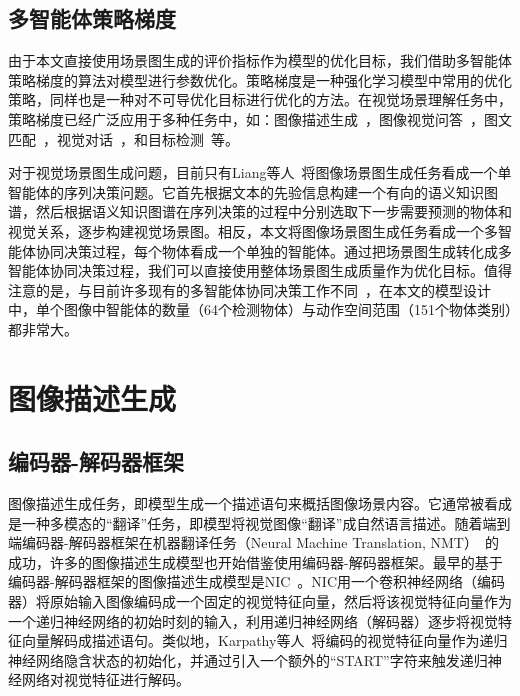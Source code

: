 \subsection{多智能体策略梯度}

由于本文直接使用场景图生成的评价指标作为模型的优化目标，我们借助多智能体策略梯度的算法对模型进行参数优化。策略梯度是一种强化学习模型中常用的优化策略，同样也是一种对不可导优化目标进行优化的方法。在视觉场景理解任务中，策略梯度已经广泛应用于多种任务中，如：图像描述生成~\cite{ranzato2016sequence,ren2017deep,liu2017improved,rennie2017self,zhang2017actor,liu2018context}，图像视觉问答~\cite{hu2017learning,johnson2017inferring}，图文匹配~\cite{chen2017query,yu2017joint}，视觉对话~\cite{das2017learning}，和目标检测~\cite{caicedo2015active,mathe2016reinforcement,jie2016tree}等。

对于视觉场景图生成问题，目前只有Liang等人~\cite{liang2017deep}将图像场景图生成任务看成一个单智能体的序列决策问题。它首先根据文本的先验信息构建一个有向的语义知识图谱，然后根据语义知识图谱在序列决策的过程中分别选取下一步需要预测的物体和视觉关系，逐步构建视觉场景图。相反，本文将图像场景图生成任务看成一个多智能体协同决策过程，每个物体看成一个单独的智能体。通过把场景图生成转化成多智能体协同决策过程，我们可以直接使用整体场景图生成质量作为优化目标。值得注意的是，与目前许多现有的多智能体协同决策工作不同~\cite{foerster2016learning,omidshafiei2017deep}，在本文的模型设计中，单个图像中智能体的数量（64个检测物体）与动作空间范围（151个物体类别）都非常大。


\section{图像描述生成}

\subsection{编码器-解码器框架}

图像描述生成任务，即模型生成一个描述语句来概括图像场景内容。它通常被看成是一种多模态的“翻译”任务，即模型将视觉图像“翻译”成自然语言描述。随着端到端编码器-解码器框架在机器翻译任务（Neural Machine Translation, NMT）~\cite{sutskever2014sequence}的成功，许多的图像描述生成模型也开始借鉴使用编码器-解码器框架。最早的基于编码器-解码器框架的图像描述生成模型是NIC~\cite{vinyals2015show}。NIC用一个卷积神经网络（编码器）将原始输入图像编码成一个固定的视觉特征向量，然后将该视觉特征向量作为一个递归神经网络的初始时刻的输入，利用递归神经网络（解码器）逐步将视觉特征向量解码成描述语句。类似地，Karpathy等人~\cite{karpathy2015deep}将编码的视觉特征向量作为递归神经网络隐含状态的初始化，并通过引入一个额外的“START”字符来触发递归神经网络对视觉特征进行解码。

